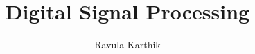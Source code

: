\documentclass[journal,12pt,twocolumn]{IEEEtran}
\begin{document}
\vspace{3cm}

\title{ 
Digital Signal Processing
}


%
%
%

\author{Ravula Karthik%
}
% 
%



% 
\end{document}

